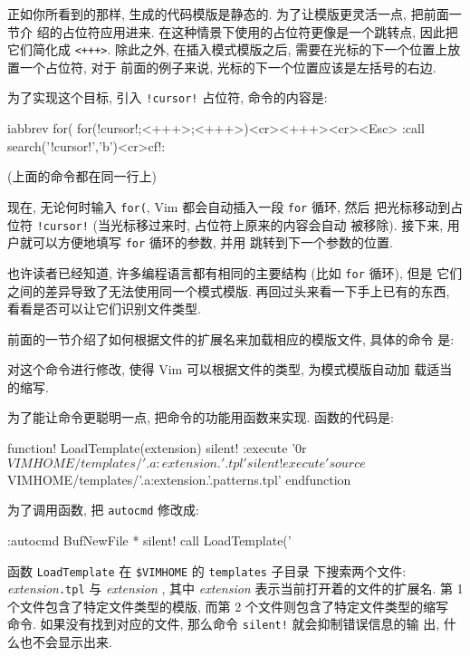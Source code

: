 正如你所看到的那样, 生成的代码模版是静态的. 为了让模版更灵活一点, 把前面一节介
绍的占位符应用进来.
在这种情景下使用的占位符更像是一个跳转点, 因此把它们简化成 \texttt{<+++>}.
除此之外, 在插入模式模版之后, 需要在光标的下一个位置上放置一个占位符, 对于
前面的例子来说, 光标的下一个位置应该是左括号的右边.

为了实现这个目标, 引入 \texttt{!cursor!} 占位符, 命令的内容是:
\begin{vimcode}
iabbrev for( for(!cursor!;<+++>;<+++>){<cr><+++><cr>}<Esc>
    :call search('!cursor!','b')<cr>cf!:
\end{vimcode}
(上面的命令都在同一行上)

现在, 无论何时输入 \texttt{for(}, Vim 都会自动插入一段 \texttt{for} 循环, 然后
把光标移动到占位符 \texttt{!cursor!} (当光标移过来时, 占位符上原来的内容会自动
被移除). 接下来, 用户就可以方便地填写 \texttt{for} 循环的参数, 并用 
跳转到下一个参数的位置.

也许读者已经知道, 许多编程语言都有相同的主要结构 (比如 \texttt{for} 循环), 但是
它们之间的差异导致了无法使用同一个模式模版. 再回过头来看一下手上已有的东西,
看看是否可以让它们识别文件类型.

前面的一节介绍了如何根据文件的扩展名来加载相应的模版文件, 具体的命令
是:
对这个命令进行修改, 使得 Vim 可以根据文件的类型, 为模式模版自动加
载适当的缩写.

为了能让命令更聪明一点, 把命令的功能用函数来实现. 函数的代码是:
\begin{vimcode}
function! LoadTemplate(extension)
    silent! :execute '0r $VIMHOME/templates/'. a:extension. '.tpl'
    silent! execute 'source $VIMHOME/templates/'.a:extension.'.patterns.tpl'
endfunction
\end{vimcode}
为了调用函数, 把 \texttt{autocmd} 修改成:
\begin{vimcode}
:autocmd BufNewFile * silent! call LoadTemplate('%
\end{vimcode}
函数 \texttt{LoadTemplate} 在 \texttt{\$VIMHOME} 的 \texttt{templates} 子目录
下搜索两个文件: \textit{extension}\texttt{.tpl} 与 \textit{extension}
,
其中 \textit{extension} 表示当前打开着的文件的扩展名.
第 1 个文件包含了特定文件类型的模版, 而第 2 个文件则包含了特定文件类型的缩写
命令. 如果没有找到对应的文件, 那么命令 \texttt{silent!} 就会抑制错误信息的输
出, 什么也不会显示出来.

